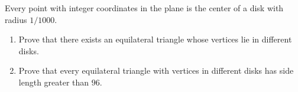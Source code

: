 Every point with integer coordinates in the plane is the center of a disk with radius $1/1000$.
\begin{enumerate}
\item[(a)] Prove that there exists an equilateral triangle whose vertices lie in different disks.
\item[(b)] Prove that every equilateral triangle with vertices in different disks has side length greater than $96$.
\end{enumerate}
